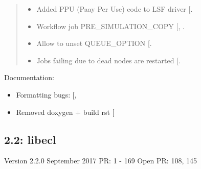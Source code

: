 \documentclass[letterpaper,10pt,english]{sphinxmanual}
\begin{document}
\begin{quote}
\begin{itemize}
\item {} 
Added PPU (Paay Per Use) code to LSF driver {[}\sphinxhref{https://github.com/Statoil/res/pull/71/}{71}{]}.

\item {} 
Workflow job PRE\_SIMULATION\_COPY {[}, \sphinxhref{https://github.com/Statoil/res/pull/88/}{88}{]}.

\item {} 
Allow to unset QUEUE\_OPTION {[}\sphinxhref{https://github.com/Statoil/res/pull/87/}{87}{]}.

\item {} 
Jobs failing due to dead nodes are restarted {[}\sphinxhref{https://github.com/Statoil/res/pull/100/}{100}{]}.

\end{itemize}
\end{quote}

Documentation:
\begin{itemize}
\item {} 
Formatting bugs: {[}, \sphinxhref{https://github.com/Statoil/res/pull/50/}{50}{]}

\item {} 
Removed doxygen + build rst {[}\sphinxhref{https://github.com/Statoil/res/pull/29/}{29}{]}

\end{itemize}


\subsection{2.2: libecl}
\label{\detokenize{changes/index:id117}}
Version 2.2.0 September 2017 PR: 1 - 169
Open PR: 108, 145
\end{document}

